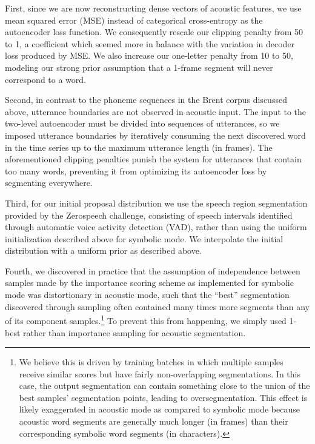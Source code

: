 \documentclass[11pt,letterpaper]{article}
\begin{document}
First, since we are now reconstructing dense vectors of acoustic
features, we use mean squared error (MSE) instead of categorical
cross-entropy as the autoencoder loss function.  We consequently
rescale our clipping penalty from 50 to 1, a coefficient which seemed
more in balance with the variation in decoder loss produced by MSE.
We also increase our one-letter penalty from 10 to 50, modeling our
strong prior assumption that a 1-frame segment will never correspond
to a word.

Second, in contrast to the phoneme sequences in the Brent corpus
discussed above, utterance boundaries are not observed in acoustic
input.  The input to the two-level autoencoder must be divided into
sequences of utterances, so we imposed utterance boundaries by
iteratively consuming the next discovered word in the time series up
to the maximum utterance length (in frames).  The aforementioned
clipping penalties punish the system for utterances that contain too
many words, preventing it from optimizing its autoencoder loss by
segmenting everywhere.

Third, for our initial proposal distribution we use the speech region
segmentation provided by the Zerospeech challenge, consisting of
speech intervals identified through automatic voice activity detection
(VAD), rather than using the uniform initialization described above
for symbolic mode.  We interpolate the initial distribution with a
uniform prior as described above.

Fourth, we discovered in practice that the assumption of independence
between samples made by the importance scoring scheme as implemented
for symbolic mode was distortionary in acoustic mode, such that the
``best'' segmentation discovered through sampling often contained many
times more segments than any of its component samples.\footnote{We
  believe this is driven by training batches in which multiple samples
  receive similar scores but have fairly non-overlapping
  segmentations.  In this case, the output segmentation can contain
  something close to the union of the best samples' segmentation
  points, leading to oversegmentation.  This effect is likely
  exaggerated in acoustic mode as compared to symbolic mode because
  acoustic word segments are generally much longer (in frames) than
  their corresponding symbolic word segments (in characters).}  To
prevent this from happening, we simply used 1-best rather than
importance sampling for acoustic segmentation.
\end{document}
